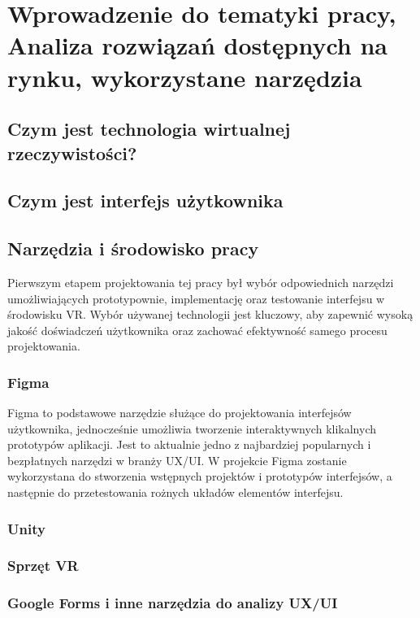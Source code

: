 \chapter{Wprowadzenie do tematyki pracy, Analiza rozwiązań dostępnych na rynku, wykorzystane narzędzia}



\section {Czym jest technologia wirtualnej rzeczywistości?}
\section {Czym jest interfejs użytkownika}
\section {Narzędzia i środowisko pracy}

Pierwszym etapem projektowania tej pracy był wybór odpowiednich narzędzi umożliwiających prototypownie, implementację oraz testowanie interfejsu w środowisku VR. Wybór używanej technologii jest kluczowy, aby zapewnić wysoką jakość doświadczeń użytkownika oraz zachować efektywność samego procesu projektowania.

\subsection{Figma}
Figma to podstawowe narzędzie służące do projektowania interfejsów użytkownika, jednocześnie umożliwia tworzenie interaktywnych klikalnych prototypów aplikacji. Jest to aktualnie jedno z najbardziej popularnych i bezpłatnych narzędzi w branży UX/UI. W projekcie Figma zostanie wykorzystana do stworzenia wstępnych projektów i prototypów interfejsów, a następnie do przetestowania rożnych układów elementów interfejsu. 
\subsection{Unity}
\subsection{Sprzęt VR}
\subsection{Google Forms i inne narzędzia do analizy UX/UI}








